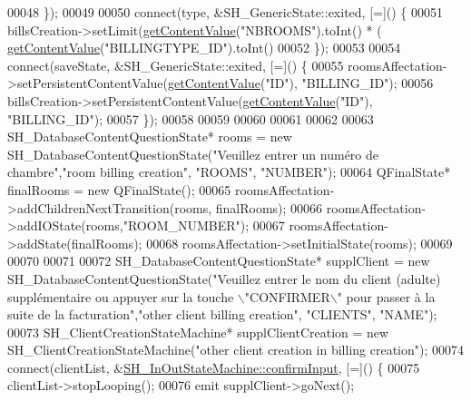 \begin{DoxyCode}
00048     \});
00049 
00050     connect(type, &SH\_GenericState::exited, [=]() \{
00051         billsCreation->setLimit(\hyperlink{classSimpleHotel_1_1SH__InOutStateMachine_a4e2afab69163c7ce53dd6a40c793d5dc}{getContentValue}(\textcolor{stringliteral}{"NBROOMS"}).toInt() * (
      \hyperlink{classSimpleHotel_1_1SH__InOutStateMachine_a4e2afab69163c7ce53dd6a40c793d5dc}{getContentValue}(\textcolor{stringliteral}{"BILLINGTYPE\_ID"}).toInt() %
00052     \});
00053 
00054     connect(saveState, &SH\_GenericState::exited, [=]() \{
00055         roomsAffectation->setPersistentContentValue(\hyperlink{classSimpleHotel_1_1SH__InOutStateMachine_a4e2afab69163c7ce53dd6a40c793d5dc}{getContentValue}(\textcolor{stringliteral}{"ID"}), \textcolor{stringliteral}{"BILLING\_ID"});
00056         billsCreation->setPersistentContentValue(\hyperlink{classSimpleHotel_1_1SH__InOutStateMachine_a4e2afab69163c7ce53dd6a40c793d5dc}{getContentValue}(\textcolor{stringliteral}{"ID"}), \textcolor{stringliteral}{"BILLING\_ID"});
00057     \});
00058 
00059 
00060 
00061 
00062 
00063     SH\_DatabaseContentQuestionState* rooms = \textcolor{keyword}{new} SH\_DatabaseContentQuestionState(\textcolor{stringliteral}{"Veuillez entrer un numéro
       de chambre"},\textcolor{stringliteral}{"room billing creation"}, \textcolor{stringliteral}{"ROOMS"}, \textcolor{stringliteral}{"NUMBER"});
00064     QFinalState* finalRooms = \textcolor{keyword}{new} QFinalState();
00065     roomsAffectation->addChildrenNextTransition(rooms, finalRooms);
00066     roomsAffectation->addIOState(rooms,\textcolor{stringliteral}{"ROOM\_NUMBER"});
00067     roomsAffectation->addState(finalRooms);
00068     roomsAffectation->setInitialState(rooms);
00069 
00070 
00071 
00072     SH\_DatabaseContentQuestionState* supplClient = \textcolor{keyword}{new} SH\_DatabaseContentQuestionState(\textcolor{stringliteral}{"Veuillez entrer le
       nom du client (adulte) supplémentaire ou appuyer sur la touche \(\backslash\)"CONFIRMER\(\backslash\)" pour passer à la suite de la
       facturation"},\textcolor{stringliteral}{"other client billing creation"}, \textcolor{stringliteral}{"CLIENTS"}, \textcolor{stringliteral}{"NAME"});
00073     SH\_ClientCreationStateMachine* supplClientCreation = \textcolor{keyword}{new} SH\_ClientCreationStateMachine(\textcolor{stringliteral}{"other client
       creation in billing creation"});
00074     connect(clientList, &\hyperlink{classSimpleHotel_1_1SH__InOutStateMachine_a949cdb448f813f201b6ca827d1c860e9}{SH\_InOutStateMachine::confirmInput}, [=]() \{
00075         clientList->stopLooping();
00076         emit supplClient->goNext();

\end{DoxyCode}
